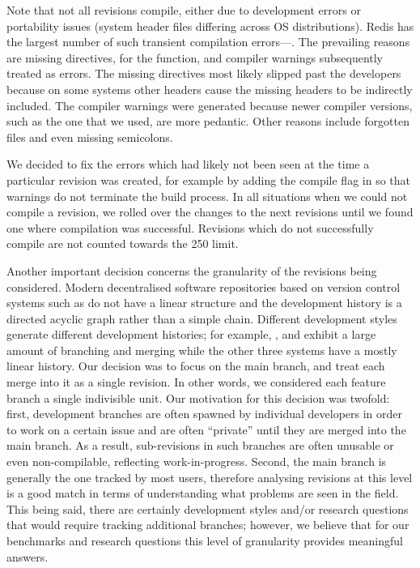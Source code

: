 Note that not all revisions compile, either due to development errors
or portability issues (\eg system header files differing across OS
distributions).
Redis has the largest number of such transient compilation
errors---\redisTransientCompErrs.  The prevailing reasons are
missing  directives, \eg {} for
the  function, and compiler warnings subsequently treated as errors.
The missing  directives most likely slipped past the
developers because on some systems other  headers cause the
missing headers to be indirectly included. The compiler warnings were
generated because newer compiler versions, such as the one that we used,
are more pedantic.
Other reasons include forgotten files and even missing semicolons.

We decided to fix the errors which had likely not been seen at the
time a particular revision was created, for example by adding the
compile flag  in \binutils so that warnings do not
terminate the build process. In all situations when we could not
compile a revision, we rolled over the changes to the next revisions
until we found one where compilation was successful.  Revisions which
do not successfully compile are not counted towards the 250 limit.

Another important decision concerns the granularity of the revisions
being considered.  Modern decentralised software repositories based on
version control systems such as \git do not have a linear structure
and the development history is a directed acyclic graph rather than a
simple chain.  Different development styles generate different
development histories; for example, \git, \redis and \zeromq exhibit a
large amount of branching and merging while the other three systems
have a mostly linear history.  Our decision was to focus on the main branch,
and treat each merge into it as a single revision. In other words, we
considered each feature branch a single indivisible unit.  Our
motivation for this decision was twofold: first, development branches
are often spawned by individual developers in order to work on a
certain issue and are often ``private'' until they are merged into the
main branch.  As a result, sub-revisions in such branches are often
unusable or even non-compilable, reflecting work-in-progress.  Second,
the main branch is generally the one tracked by most users, therefore
analysing revisions at this level is a good match in terms of
understanding what problems are seen in the field.  This being said,
there are certainly development styles and/or research questions that
would require tracking additional branches; however, we believe that
for our benchmarks and research questions this level of granularity
provides meaningful answers.

